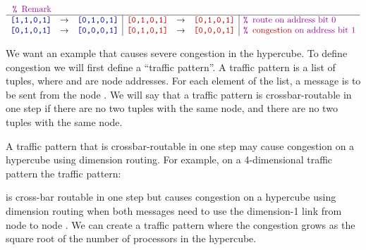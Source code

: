 \documentclass{article}
\newenvironment{answer}
{\color{blue}}
{\normalfont}
\begin{document}
\begin{enumerate}
\begin{enumerate}
\begin{answer}
\begin{displaymath}
\begin{array}{rcl|rcl|l}
                                \code{\xcomment{Remark}}                                                                                    \\\hline
                                \code{[1,1,0,1]}                                        & \rightarrow & \code{[0,1,0,1]}                  &
                                \code{\color{MediumRed}[0,1,0,1]}                       & \rightarrow & \code{\color{MediumRed}[0,1,0,1]} &
                                \code{\xcomment{route on address bit 0}}                                                                    \\
                                \code{[0,1,0,1]}                                        & \rightarrow & \code{[0,0,0,1]}                  &
                                \code{\color{MediumRed}[0,1,0,1]}                       & \rightarrow & \code{\color{MediumRed}[0,0,0,1]} &
                                \code{\xcomment{{\color{MediumRed}congestion} on address bit 1}}                                            \\
                            \end{array}\end{displaymath}
                    \end{answer}
          \end{enumerate}

          We want an example that causes severe congestion in the hypercube.
          To define congestion we will first define a ``traffic pattern''.
          A traffic pattern is a list of  tuples, where
           and  are node addresses.
          For each element of the list, a message is to be sent from the 
          node .  We will say that a traffic pattern is crossbar-routable
          in one step if there are no two tuples with the same  node,
          and there are no two tuples with the same  node.

          A traffic pattern that is crossbar-routable in one step may cause congestion
          on a hypercube using dimension routing.
          For example, on a 4-dimensional traffic pattern the traffic pattern:
          \begin{xcode}
              [\tuple{[0,1,0,1], [1,0,0,1]}, \tuple{[1,1,0,1], [1,0,0,0]}]
          \end{xcode}
          is cross-bar routable in one step but causes congestion on a hypercube using
          dimension routing when both messages need to use the dimension-1 link from node \code{[1,1,0,1]}
          to node \code{[1,0,0,1]}.
          We can create a traffic pattern where the congestion grows as the square root
          of the number of processors in the hypercube.


\end{enumerate}
\end{document}
